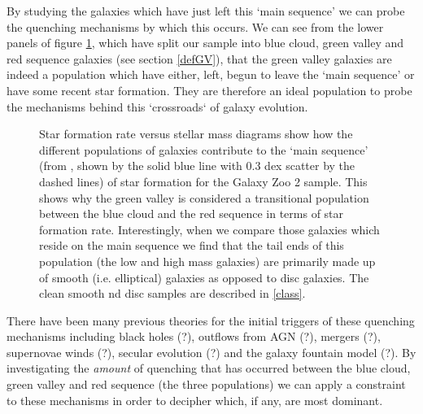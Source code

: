 \documentclass{mn2e}
\begin{document}
By studying the galaxies which  have just left this `main sequence' we can probe the quenching mechanisms by which this occurs. We can see from the lower panels of figure \ref{sfr_mass_sub}, which have split our sample into blue cloud, green valley and red sequence galaxies (see section \ref{defGV}), that the green valley galaxies are indeed a population which have either, left, begun to leave the `main sequence' or have some recent star formation. They are therefore an ideal population to probe the mechanisms behind this `crossroads` of galaxy evolution.

\begin{figure}
\caption{Star formation rate versus stellar mass diagrams show how the different populations of galaxies contribute to the `main sequence' (from \citet{Peng}, shown by the solid blue line with 0.3 dex scatter by the dashed lines) of star formation for the Galaxy Zoo 2 sample. This shows why the green valley is considered a transitional population between the blue cloud and the red sequence in terms of star formation rate. Interestingly, when we compare those galaxies which reside on the main sequence we find that the tail ends of this population (the low and high mass galaxies) are primarily made up of smooth (i.e. elliptical) galaxies as opposed to disc galaxies. The clean smooth nd disc samples are described in \ref{class}.}
\label{sfr_mass_sub}
\end{figure}

There have been many previous theories for the initial triggers of these quenching mechanisms including black holes (?), outflows from AGN (?), mergers (?), supernovae winds (?), secular evolution (?) and the galaxy fountain model (?). By investigating the \emph{amount} of quenching that has occurred between the blue cloud, green valley and red sequence (the three populations) we can apply a constraint to these mechanisms in order to decipher which, if any, are most dominant. 
\end{document}

